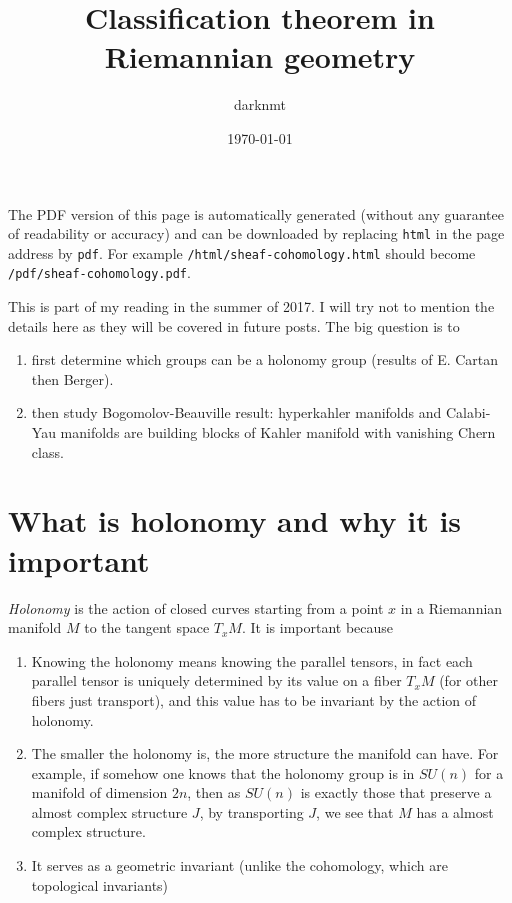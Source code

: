 \documentclass[11pt]{article}
\author{darknmt}
\date{\today}
\title{Classification theorem in Riemannian geometry}
\begin{document}
\maketitle
\tableofcontents

\begin{info}
The PDF version of this page is automatically generated (without any guarantee of
readability or accuracy) and can be downloaded by replacing \texttt{html} in the page address by
\texttt{pdf}. 
For example \texttt{/html/sheaf-cohomology.html} should become \texttt{/pdf/sheaf-cohomology.pdf}.
\end{info}

This is part of my reading in the summer of 2017. I will try not to mention the details here as they
will be covered in future posts. The big question is to 
\begin{enumerate}
\item first determine which groups can be a holonomy group (results of E. Cartan then Berger).
\item then study Bogomolov-Beauville result: hyperkahler manifolds and Calabi-Yau manifolds are
building blocks of Kahler manifold with vanishing Chern class.
\end{enumerate}

\section{What is holonomy and why it is important}
\label{sec:org5b05145}

\emph{Holonomy} is the action of closed curves starting from a point \(x\) in a Riemannian manifold \(M\) to
the tangent space \(T_xM\). It is important because

\begin{enumerate}
\item Knowing the holonomy means knowing the parallel tensors, in fact each parallel tensor is uniquely
determined by its value on a fiber \(T_xM\) (for other fibers just transport), and this value has
to be invariant by the action of holonomy.
\item The smaller the holonomy is, the more structure the manifold can have. For example, if somehow
one knows that the holonomy group is in \(SU(n)\) for a manifold of dimension \(2n\), then as \(SU(n)\)
is exactly those that preserve a almost complex structure \(J\), by transporting \(J\), we see that
\(M\) has a almost complex structure.
\item It serves as a geometric invariant (unlike the cohomology, which are topological invariants)
\end{enumerate}
\end{document}
